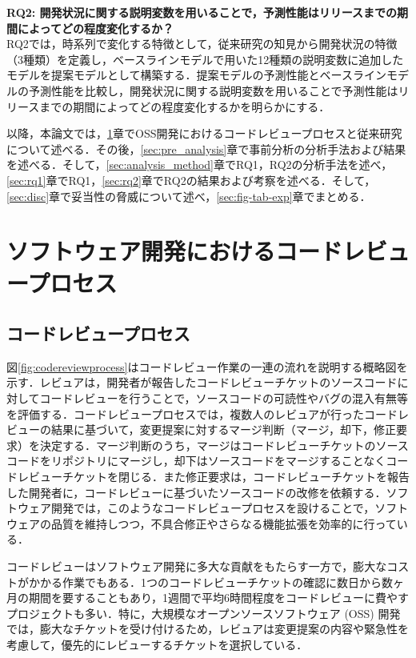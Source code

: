 \documentclass[submit]{ipsj}
\newcommand{\rqtwo}{開発状況に関する説明変数を用いることで，予測性能はリリースまでの期間によってどの程度変化するか？}
\begin{document}
\noindent\textbf{RQ2: \rqtwo}\\
RQ2では，時系列で変化する特徴として，従来研究\cite{integrator}\cite{release_merge}の知見から開発状況の特徴（3種類）を定義し，ベースラインモデルで用いた12種類の説明変数に追加したモデルを提案モデルとして構築する．提案モデルの予測性能とベースラインモデルの予測性能を比較し，開発状況に関する説明変数を用いることで予測性能はリリースまでの期間によってどの程度変化するかを明らかにする．

以降，本論文では，\ref{sec:intro}章でOSS開発におけるコードレビュープロセスと従来研究について述べる．その後，\ref{sec:pre_analysis}章で事前分析の分析手法および結果を述べる．そして，\ref{sec:analysis_method}章でRQ1，RQ2の分析手法を述べ，\ref{sec:rq1}章でRQ1，\ref{sec:rq2}章でRQ2の結果および考察を述べる．そして，\ref{sec:disc}章で妥当性の脅威について述べ，\ref{sec:fig-tab-exp}章でまとめる．

\section{ソフトウェア開発におけるコードレビュープロセス}\label{sec:intro}

\subsection{コードレビュープロセス}
図\ref{fig:codereviewprocess}はコードレビュー作業の一連の流れを説明する概略図を示す．レビュアは，開発者が報告したコードレビューチケットのソースコードに対してコードレビューを行うことで，ソースコードの可読性やバグの混入有無等を評価する．コードレビュープロセスでは，複数人のレビュアが行ったコードレビューの結果に基づいて，変更提案に対するマージ判断（マージ，却下，修正要求）を決定する．マージ判断のうち，マージはコードレビューチケットのソースコードをリポジトリにマージし，却下はソースコードをマージすることなくコードレビューチケットを閉じる．また修正要求は，コードレビューチケットを報告した開発者に，コードレビューに基づいたソースコードの改修を依頼する．ソフトウェア開発では，このようなコードレビュープロセスを設けることで，ソフトウェアの品質を維持しつつ，不具合修正やさらなる機能拡張を効率的に行っている．

コードレビューはソフトウェア開発に多大な貢献をもたらす一方で，膨大なコストがかかる作業でもある．1つのコードレビューチケットの確認に数日から数ヶ月の期間を要することもあり，1週間で平均6時間程度をコードレビューに費やすプロジェクトも多い\cite{review2}．特に，大規模なオープンソースソフトウェア (OSS) 開発では，膨大なチケットを受け付けるため，レビュアは変更提案の内容や緊急性を考慮して，優先的にレビューするチケットを選択している\cite{integrator}．
\end{document}
